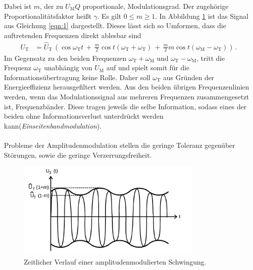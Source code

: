 Dabei ist $m$, der zu $U_{\text{M}}Q$ proportionale, Modulationsgrad.
Der zugehörige Proportionalitätsfaktor heißt $\gamma$.
Es gilt $0 \leq m \geq 1$.
In Abbildung \ref{fig:amplitudenmodulation_1} ist das Signal aus Gleichung
\eqref{eqn:1} dargestellt.
Dieses lässt sich so Umformen, dass die auftretenden Frequenzen direkt
ablesbar sind
\begin{align}
  \label{eqn:2}
  U_{\text{T}} &= \hat{U}_{\text{T}} \, \left( \cos \omega_{\text{T}} t \, + \, \frac{m}{2} \cos t\left( \omega_{\text{T}} + \omega_{\text{T}} \right) \, + \, \frac{m}{2}  m  \cos t \left( \omega_{\text{M}} - \omega_{\text{T}} \right)\right) \, .
\end{align}
Im Gegensatz zu den beiden Frequenzen $\omega_{\text{T}} + \omega_{\text{M}}$ und $\omega_{\text{T}} - \omega_{\text{M}}$, tritt die Frequenz $\omega_{\text{T}}$
unabhängig von $U_{\text{M}}$ auf und spielt somit
für die Informationsübertragung keine Rolle. Daher soll $\omega_{\text{T}}$
aus Gründen der Energieeffizienz herausgefiltert werden.
Aus den beiden übrigen Frequenzenlinien werden, wenn das Modulationssignal
aus mehreren Frequenzen zusammengesetzt ist, Frequenzbänder.
Diese tragen jeweils die selbe Information, sodass eines der beiden ohne
Informationsverlust unterdrückt werden kann(\textit{Einseitenbandmodulation}).\\ \\

Probleme der Amplitudenmodulation stellen die geringe Toleranz gegenüber
Störungen, sowie die geringe Verzerrungsfreiheit.

\begin{figure}
  \centering
  \includegraphics[width=0.8\textwidth]{figures/amplitudenmodulation.PNG}
  \caption{Zeitlicher Verlauf einer amplitudenmodulierten Schwingung.\cite{sample}}
  \label{fig:amplitudenmodulation_1}
\end{figure}


